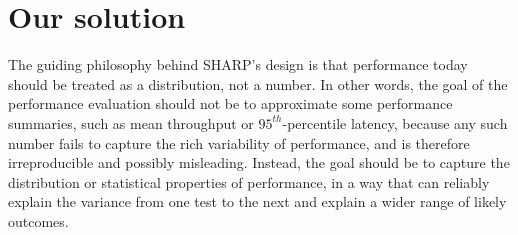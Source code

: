 \documentclass[11pt]{article}
\begin{document}

\section*{Our solution}

The guiding philosophy behind SHARP's design is that performance today should be treated as a distribution, not a number.
In other words, the goal of the performance evaluation should not be to approximate some performance summaries, such as mean throughput or $95^{th}$-percentile latency, because any such number fails to capture the rich variability of performance, and is therefore irreproducible and possibly misleading.
Instead, the goal should be to capture the distribution or statistical properties of performance, in a way that can reliably explain the variance from one test to the next and explain a wider range of likely outcomes.
\end{document}
